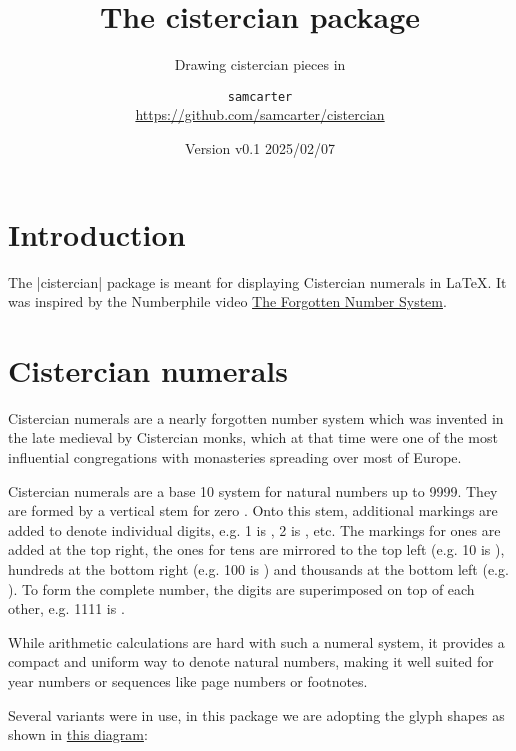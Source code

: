 \documentclass{scrartcl}
\title{The cistercian package}
\subtitle{Drawing cistercian pieces in \TikZ}
\author{%
  \texorpdfstring{
    \texttt{samcarter}\\
    \url{https://github.com/samcarter/cistercian}\\
  }{samcarter}}
\date{Version v0.1 \textendash{} 2025/02/07}
\begin{document}
\maketitle
\thispagestyle{scrheadings}

\section{Introduction}

The \saminline|cistercian| package is meant for displaying Cistercian numerals in \LaTeX{}.
It was inspired by the Numberphile video \href{https://www.youtube.com/watch?v=9p55Qgt7Ciw}{The Forgotten Number System}.

\blurb*

\section{Cistercian numerals}

Cistercian numerals are a nearly forgotten number system which was invented in the late medieval by Cistercian monks, which at that time were one of the most influential congregations with monasteries spreading over most of Europe.

Cistercian numerals are a base 10 system for natural numbers up to 9999. 
They are formed by a vertical stem for zero .
Onto this stem, additional markings are added to denote individual digits, e.g. 1 is , 2 is , etc. 
The markings for ones are added at the top right, the ones for tens are mirrored to the top left (e.g. 10 is ), hundreds at the bottom right (e.g. 100 is ) and thousands at the bottom left (e.g. ). 
To form the complete number, the digits are superimposed on top of each other, e.g. 1111 is . 

While arithmetic calculations are hard with such a numeral system, it provides a compact and uniform way to denote natural numbers, making it well suited for year numbers or sequences like page numbers or footnotes. 

Several variants were in use, in this package we are adopting the glyph shapes as shown in \href{https://upload.wikimedia.org/wikipedia/commons/6/67/Cistercian_digits_%28vertical%29.svg}{this diagram}:
\end{document}
